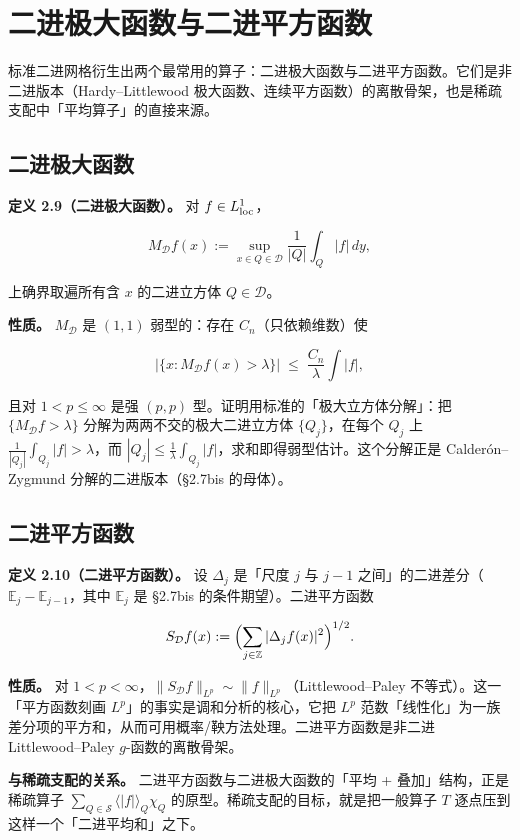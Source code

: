 \documentclass[a4paper,11pt,openany]{ctexbook}
\numberwithin{equation}{chapter}
\numberwithin{figure}{chapter}
\numberwithin{table}{chapter}
\begin{document}
\section{二进极大函数与二进平方函数}

标准二进网格衍生出两个最常用的算子：二进极大函数与二进平方函数。它们是非二进版本（Hardy–Littlewood 极大函数、连续平方函数）的离散骨架，也是稀疏支配中「平均算子」的直接来源。

\subsection{二进极大函数}

\textbf{定义 2.9（二进极大函数）。} 对 $f\in L^1_{\rm loc}$，

$$M_{\mathcal D}f(x):=\sup_{x\in Q\in\mathcal D}\frac1{|Q|}\int_Q |f|\,dy,$$

上确界取遍所有含 $x$ 的二进立方体 $Q\in\mathcal D$。

\textbf{性质。} $M_{\mathcal D}$ 是 $(1,1)$ 弱型的：存在 $C_n$（只依赖维数）使

$$|\{x:M_{\mathcal D}f(x)>\lambda\}|\;\le\; \frac{C_n}{\lambda}\int|f|,$$

且对 $1<p\le\infty$ 是强 $(p,p)$ 型。证明用标准的「极大立方体分解」：把 $\{M_{\mathcal D}f>\lambda\}$ 分解为两两不交的极大二进立方体 $\{Q_j\}$，在每个 $Q_j$ 上 $\frac1{|Q_j|}\int_{Q_j}|f|>\lambda$，而 $|Q_j|\le\frac1\lambda\int_{Q_j}|f|$，求和即得弱型估计。这个分解正是 Calderón–Zygmund 分解的二进版本（§2.7bis 的母体）。

\subsection{二进平方函数}

\textbf{定义 2.10（二进平方函数）。} 设 $\Delta_j$ 是「尺度 $j$ 与 $j-1$ 之间」的二进差分（$\mathbb E_j-\mathbb E_{j-1}$，其中 $\mathbb E_j$ 是 §2.7bis 的条件期望）。二进平方函数

$$S_{\mathcal D}f(x):=\Bigl(\sum_{j\in\mathbb Z}|\Delta_j f(x)|^2\Bigr)^{1/2}.$$

\textbf{性质。} 对 $1<p<\infty$，$\|S_{\mathcal D}f\|_{L^p}\sim\|f\|_{L^p}$（Littlewood–Paley 不等式）。这一「平方函数刻画 $L^p$」的事实是调和分析的核心，它把 $L^p$ 范数「线性化」为一族差分项的平方和，从而可用概率/鞅方法处理。二进平方函数是非二进 Littlewood–Paley $g$-函数的离散骨架。

\textbf{与稀疏支配的关系。} 二进平方函数与二进极大函数的「平均 + 叠加」结构，正是稀疏算子 $\sum_{Q\in\mathcal S}\langle|f|\rangle_Q\chi_Q$ 的原型。稀疏支配的目标，就是把一般算子 $T$ 逐点压到这样一个「二进平均和」之下。
\end{document}

